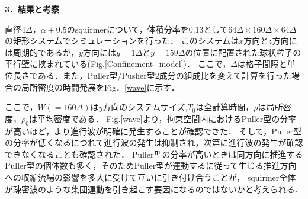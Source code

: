 \documentclass[twocolumns,10pt,a4j]{jarticle}
\begin{document}

  \noindent
  {\bf \large 3．結果と考察}
  \par
直径$4\Delta$，$\alpha\pm0.5$のsquirmerについて，体積分率を0.13として$64\Delta×\!\!160\Delta×\!\!64\Delta$の矩形システムでシミュレーションを行った．
このシステムは$x$方向と$z$方向には周期的であるが，$y$方向には$y =1\Delta$と$y=159\Delta$の位置に配置された球状粒子の平行壁に挟まれている(Fig.\ref{Confinement_model})．
ここで，$\Delta$は格子間隔と単位長さである．また，Puller型/Pusher型2成分の組成比を変えて計算を行った場合の局所密度の時間発展をFig．\ref{wave}に示す．



  \noindent
ここで，$W(=160\Delta)$は$y$方向のシステムサイズ,$T_0$は全計算時間，$\rho$は局所密度，$\rho_0$は平均密度である．
Fig.\ref{wave}より，拘束空間内におけるPuller型の分率が高いほど，より進行波が明確に発生することが確認できた．
そして，Puller型の分率が低くなるにつれて進行波の発生は抑制され，次第に進行波の発生が確認できなくなることも確認された．
Puller型の分率が高いときは同方向に推進するPuller型の個体数も多く，そのためPuller型が運動するに従って生じる推進方向への収縮流場の影響を多大に受けて互いに引き付け合うことが，
squirmer全体が疎密波のような集団運動を引き起こす要因になるのではないかと考えられる．
\end{document}

